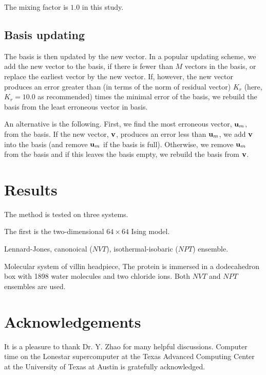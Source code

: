 \documentclass[aip,jcp,preprint,superscriptaddress]{revtex4-1}
\begin{document}
The mixing factor is $1.0$ in this study.



\subsection{Basis updating}



The basis is then updated by the new vector.
%
In a popular updating scheme\cite{kovalenko1999},
we add the new vector to the basis,
if there is fewer than $M$ vectors in the basis,
%
or replace the earliest vector by the new vector.
%
If, however, the new vector
produces an error greater than
(in terms of the norm of residual vector)
$K_r$ (here, $K_r = 10.0$ as recommended)
times the minimal error of the basis,
%
we rebuild the basis
from the least erroneous vector in basis.



An alternative is the following.
%
First, we find the most erroneous vector,
$\mathbf{u}_m$, from the basis.
%
If the new vector, $\mathbf{v}$,
produces an error less than $\mathbf{u}_m$,
we add $\mathbf{v}$ into the basis
(and remove $\mathbf{u}_m$ if the basis is full).
%
Otherwise,
we remove $\mathbf{u}_m$ from the basis
and if this leaves the basis empty,
we rebuild the basis from $\mathbf{v}$.
%



\section{Results}



The method is tested on three systems.


The first is the two-dimensional $64\times64$ Ising model.


Lennard-Jones, canonoical ($NVT$), isothermal-isobaric ($NPT$) ensemble.



Molecular system of villin headpiece,
The protein is immersed in
a dodecahedron box with 1898 water molecules and two chloride ions.
%
Both $NVT$ and $NPT$ ensembles are used.





\section{Acknowledgements}



It is a pleasure to thank Dr. Y. Zhao
for many helpful discussions.
%
Computer time on the Lonestar supercomputer
at the Texas Advanced Computing Center
at the University of Texas at Austin
is gratefully acknowledged.




\end{document}
